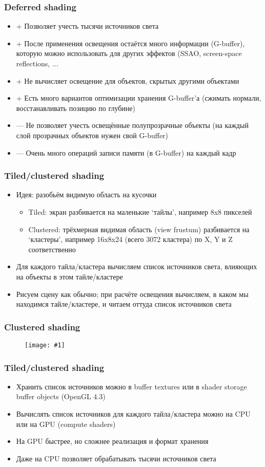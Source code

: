 \documentclass{beamer}
\newcommand{\slideimage}[1]{
  \begin{figure}
    \begin{adjustbox}{width=\textwidth, totalheight=\textheight-2\baselineskip-2\baselineskip,keepaspectratio}
      \texttt{[image: \#1]}
    \end{adjustbox}
  \end{figure}
}
\begin{document}
\begin{frame}[fragile]
\frametitle{Deferred shading}
\begin{itemize}
\item {\color{green}+} Позволяет учесть тысячи источников света
\item {\color{green}+} После применения освещения остаётся много информации (G-buffer), которую можно использовать для других эффектов (SSAO, screen-space reflections, ...
\item {\color{green}+} Не вычисляет освещение для объектов, скрытых другими объектами
\item {\color{green}+} Есть много вариантов оптимизации хранения G-buffer'а (сжимать нормали, восстанавливать позицию по глубине)
\item {\color{red}—} Не позволяет учесть освещённые полупрозрачные объекты (на каждый слой прозрачных объектов нужен свой G-buffer)
\item {\color{red}—} Очень много операций записи памяти (в G-buffer) на каждый кадр
\end{itemize}
\end{frame}

\begin{frame}[fragile]
\frametitle{Tiled/clustered shading}
\begin{itemize}
\item Идея: разобьём видимую область на кусочки
\begin{itemize}
\item Tiled: экран разбивается на маленькие `тайлы', например 8x8 пикселей
\item Clustered: трёхмерная видимая область (view frustum) разбивается на `кластеры', например 16x8x24 (всего 3072 кластера) по X, Y и Z соответственно
\end{itemize}
\pause
\item Для каждого тайла/кластера вычисляем список источников света, влияющих на объекты в этом тайле/кластере
\pause
\item Рисуем сцену как обычно; при расчёте освещения вычисляем, в каком мы находимся тайле/кластере, и читаем оттуда список источников света
\end{itemize}
\end{frame}

\begin{frame}[fragile]
\frametitle{Clustered shading}
\slideimage{clustered.png}
\end{frame}

\begin{frame}[fragile]
\frametitle{Tiled/clustered shading}
\begin{itemize}
\item Хранить список источников можно в buffer textures или в shader storage buffer objects (OpenGL 4.3)
\pause
\item Вычислять список источников для каждого тайла/кластера можно на CPU или на GPU (compute shaders)
\pause
\item На GPU быстрее, но сложнее реализация и формат хранения
\pause
\item Даже на CPU позволяет обрабатывать тысячи источников света
\end{itemize}
\end{frame}
\end{document}
